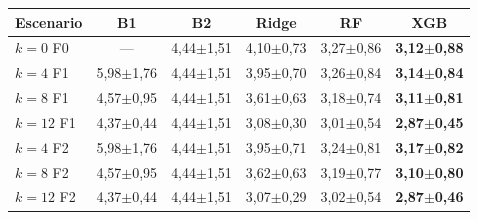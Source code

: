 \begin{tabular}{@{}lccccc@{}}
\toprule
Escenario & B1 & B2 & Ridge & RF & XGB \\
\midrule
$k=0$ F0 & — & 4,44$\pm$1,51 & 4,10$\pm$0,73 & 3,27$\pm$0,86 & \textbf{3,12$\pm$0,88} \\
$k=4$ F1 & 5,98$\pm$1,76 & 4,44$\pm$1,51 & 3,95$\pm$0,70 & 3,26$\pm$0,84 & \textbf{3,14$\pm$0,84} \\
$k=8$ F1 & 4,57$\pm$0,95 & 4,44$\pm$1,51 & 3,61$\pm$0,63 & 3,18$\pm$0,74 & \textbf{3,11$\pm$0,81} \\
$k=12$ F1 & 4,37$\pm$0,44 & 4,44$\pm$1,51 & 3,08$\pm$0,30 & 3,01$\pm$0,54 & \textbf{2,87$\pm$0,45} \\
$k=4$ F2 & 5,98$\pm$1,76 & 4,44$\pm$1,51 & 3,95$\pm$0,71 & 3,24$\pm$0,81 & \textbf{3,17$\pm$0,82} \\
$k=8$ F2 & 4,57$\pm$0,95 & 4,44$\pm$1,51 & 3,62$\pm$0,63 & 3,19$\pm$0,77 & \textbf{3,10$\pm$0,80} \\
$k=12$ F2 & 4,37$\pm$0,44 & 4,44$\pm$1,51 & 3,07$\pm$0,29 & 3,02$\pm$0,54 & \textbf{2,87$\pm$0,46} \\
\bottomrule
\end{tabular}
